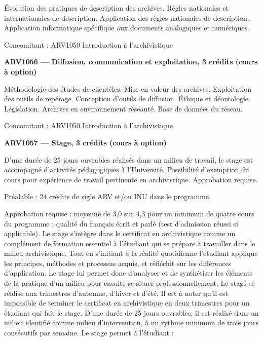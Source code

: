 \documentclass [12 pt]{article}
\begin{document}
            Évolution des pratiques de description des archives. Règles nationales et
                internationales de description. Application des règles nationales de description.
                Application informatique spécifique aux documents analogiques et numériques.
            
                Concomitant : ARV1050 Introduction à l'archivistique
            
            
        \textbf{
        ARV1056 — Diffusion, communication et exploitation, 3 crédits (cours à option)
        }
    
            Méthodologie des études de clientèles. Mise en valeur des archives. Exploitation des
                outils de repérage. Conception d'outils de diffusion. Éthique et déontologie.
                Législation. Archives en environnement réseauté. Base de données du réseau.
            
                Concomitant : ARV1050 Introduction à l'archivistique
            
            
        \textbf{
        ARV1057 — Stage, 3 crédits (cours à option)
        }
    
            D'une durée de 25 jours ouvrables réalisés dans un milieu de travail, le stage est
                accompagné d'activités pédagogiques à l'Université. Possibilité d'exemption du cours
                pour expérience de travail pertinente en archivistique. Approbation requise.
            
                Préalable : 24 crédits de sigle ARV et/ou INU dans le programme.
            
            Approbation requise : moyenne de 3,0 sur 4,3 pour un minimum de
                quatre cours du programme ; qualité du français écrit et parlé (test d'admission
                réussi si applicable).
            Le stage s'intègre dans le certificat en archivistique comme un complément de
                formation essentiel à l'étudiant qui se prépare à travailler dans le milieu
                archivistique. Tout en s'initiant à la réalité quotidienne l'étudiant applique les
                principes, méthodes et processus acquis, et réfléchit sur les différences
                d'application. Le stage lui permet donc d'analyser et de synthétiser les éléments de
                la pratique d'un milieu pour ensuite se situer professionnellement.
            Le stage se réalise aux trimestres d'automne, d'hiver et d'été. Il est à noter qu'il
                est impossible de terminer le certificat en archivistique en deux trimestres pour un
                étudiant qui fait le stage. D'une durée de 25 jours ouvrables, il est réalisé dans
                un milieu identifié comme milieu d'intervention, à un rythme minimum de trois jours
                consécutifs par semaine.
            Le stage permet à l'étudiant :
            
\end{document}
